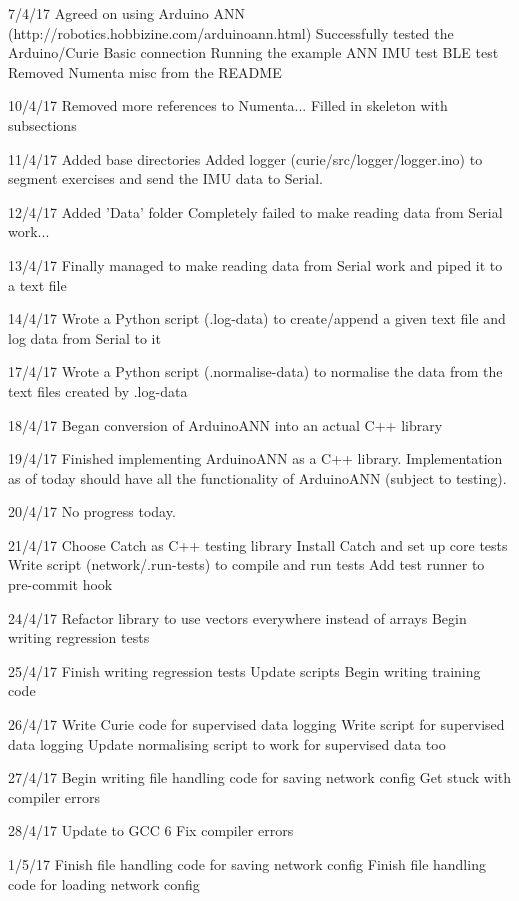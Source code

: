 \documentclass[a4paper]{article}
\begin{document}
7/4/17
    Agreed on using Arduino ANN (http://robotics.hobbizine.com/arduinoann.html)
    Successfully tested the Arduino/Curie
        Basic connection
        Running the example ANN
        IMU test
        BLE test
    Removed Numenta misc from the README

10/4/17
    Removed more references to Numenta...
    Filled in skeleton with subsections

11/4/17
    Added base directories
    Added logger (curie/src/logger/logger.ino) to segment exercises and send the IMU data to Serial.

12/4/17
    Added 'Data' folder
    Completely failed to make reading data from Serial work...

13/4/17
    Finally managed to make reading data from Serial work and piped it to a text file

14/4/17
    Wrote a Python script (.log-data) to create/append a given text file and log data from Serial to it

17/4/17
    Wrote a Python script (.normalise-data) to normalise the data from the text files created by .log-data

18/4/17
    Began conversion of ArduinoANN into an actual C++ library

19/4/17
    Finished implementing ArduinoANN as a C++ library. 
    Implementation as of today should have all the functionality of ArduinoANN (subject to testing).

20/4/17
    No progress today.

21/4/17
    Choose Catch as C++ testing library
    Install Catch and set up core tests
    Write script (network/.run-tests) to compile and run tests
    Add test runner to pre-commit hook

24/4/17
    Refactor library to use vectors everywhere instead of arrays
    Begin writing regression tests

25/4/17
    Finish writing regression tests
    Update scripts
    Begin writing training code

26/4/17
    Write Curie code for supervised data logging
    Write script for supervised data logging
    Update normalising script to work for supervised data too

27/4/17
    Begin writing file handling code for saving network config
    Get stuck with compiler errors

28/4/17
    Update to GCC 6
    Fix compiler errors

1/5/17
    Finish file handling code for saving network config
    Finish file handling code for loading network config
\end{document}
